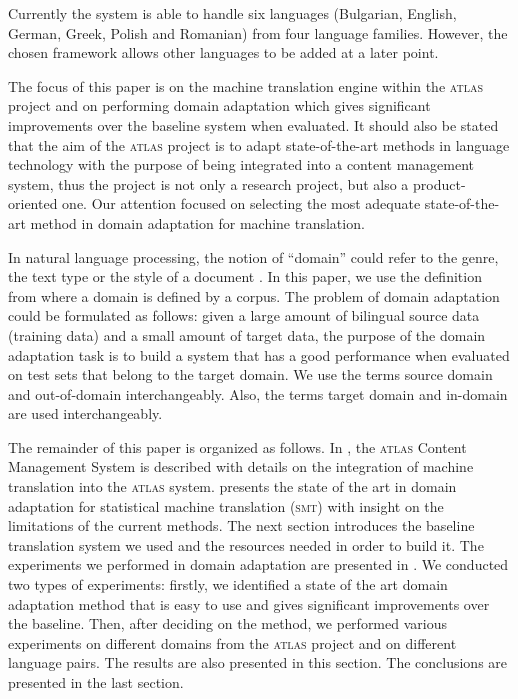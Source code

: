 \documentclass[output=paper]{LSP/langsci}
\begin{document}
Currently the system is able to handle six languages (Bulgarian, English, German, Greek, Polish and Romanian) from four language families. However, the chosen framework allows other languages to be added at a later point. 

  The focus of this paper is on the machine translation engine within the \textsc{atlas} project and on performing domain adaptation which gives significant improvements over the baseline system when evaluated. It should also be stated that the aim of the \textsc{atlas} project is to adapt state-of-the-art methods in language technology with the purpose of being integrated into a content management system, thus the project is not only a research project, but also a product-oriented one. Our attention focused on selecting the most adequate state-of-the-art method in domain adaptation for machine translation.

In natural language processing, the notion of ``domain'' could refer to the genre, the text type or the style of a document \citep{Lee2001}. In this paper, we use the definition from \citet[Chapter~3]{Plank2011} where a domain is defined by a corpus. The problem of domain adaptation could be formulated as follows: given a large amount of bilingual source data (training data) and a small amount of target data, the purpose of the domain adaptation task is to build a system that has a good performance when evaluated on test sets that belong to the target domain. We use the terms source domain and out-of-domain interchangeably. Also, the terms target domain and in-domain are used interchangeably.

  The remainder of this paper is organized as follows. In , the \textsc{atlas} Content Management System is described with details on the integration of machine translation into the \textsc{atlas} system.  presents the state of the art in domain adaptation for statistical machine translation (\textsc{smt}) with insight on the limitations of the current methods. The next section introduces the baseline translation system we used and the resources needed in order to build it. The experiments we performed in domain adaptation are presented in . We conducted two types of experiments: firstly, we identified a state of the art domain adaptation method that is easy to use and gives significant improvements over the baseline. Then, after deciding on the method, we performed various experiments on different domains from the \textsc{atlas} project and on different language pairs. The results are also presented in this section. The conclusions are presented in the last section.
\end{document}
